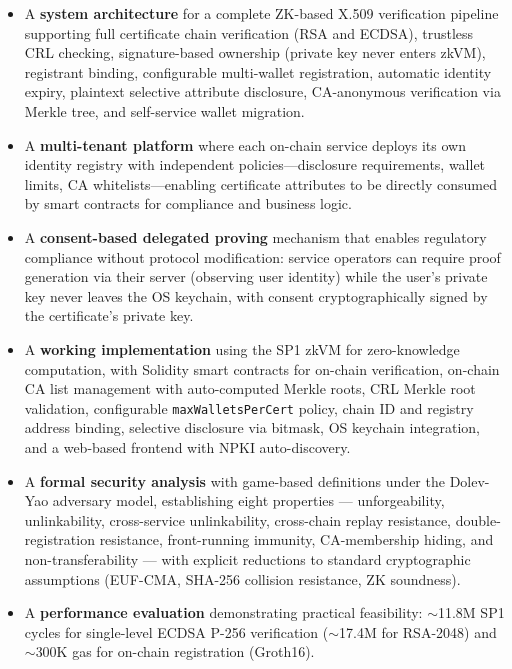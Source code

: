 \documentclass[11pt, a4paper]{article}
\providecommand{\tightlist}{%
  \setlength{\itemsep}{0pt}\setlength{\parskip}{0pt}}
\begin{document}
\begin{itemize}
\tightlist
\item
  A \textbf{system architecture} for a complete ZK-based X.509
  verification pipeline supporting full certificate chain verification
  (RSA and ECDSA), trustless CRL checking, signature-based ownership
  (private key never enters zkVM), registrant binding, configurable
  multi-wallet registration, automatic identity expiry, plaintext
  selective attribute disclosure, CA-anonymous verification via Merkle
  tree, and self-service wallet migration.
\item
  A \textbf{multi-tenant platform} where each on-chain service deploys
  its own identity registry with independent policies---disclosure
  requirements, wallet limits, CA whitelists---enabling certificate
  attributes to be directly consumed by smart contracts for compliance
  and business logic.
\item
  A \textbf{consent-based delegated proving} mechanism that enables
  regulatory compliance without protocol modification: service operators
  can require proof generation via their server (observing user identity)
  while the user's private key never leaves the OS keychain, with
  consent cryptographically signed by the certificate's private key.
\item
  A \textbf{working implementation} using the SP1 zkVM for
  zero-knowledge computation, with Solidity smart contracts for on-chain
  verification, on-chain CA list management with auto-computed Merkle
  roots, CRL Merkle root validation, configurable
  \texttt{maxWalletsPerCert} policy, chain ID and registry address
  binding, selective disclosure via bitmask, OS keychain integration,
  and a web-based frontend with NPKI auto-discovery.
\item
  A \textbf{formal security analysis} with game-based definitions under
  the Dolev-Yao adversary model, establishing eight properties ---
  unforgeability, unlinkability, cross-service unlinkability, cross-chain replay resistance, double-registration resistance,
  front-running immunity, CA-membership hiding, and non-transferability --- with
  explicit reductions to standard cryptographic assumptions (EUF-CMA,
  SHA-256 collision resistance, ZK soundness).
\item
  A \textbf{performance evaluation} demonstrating practical feasibility:
  $\sim$11.8M SP1 cycles for single-level ECDSA P-256
  verification ($\sim$17.4M for RSA-2048) and
  $\sim$300K gas for on-chain registration (Groth16).
\end{itemize}
\end{document}
